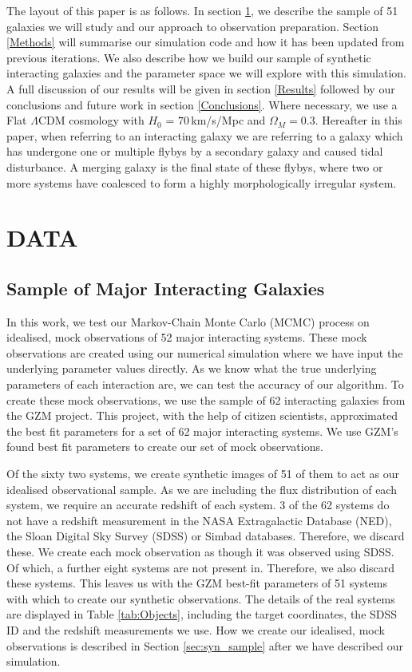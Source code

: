 The layout of this paper is as follows. In section \ref{Data}, we describe the sample of 51 galaxies we will study and our approach to observation preparation. Section \ref{Methods} will summarise our simulation code and how it has been updated from previous iterations. We also describe how we build our sample of synthetic interacting galaxies and the parameter space we will explore with this simulation. A full discussion of our results will be given in section \ref{Results} followed by our conclusions and future work in section \ref{Conclusions}. Where necessary, we use a Flat $\Lambda$CDM cosmology with $H_0$ = $70$\,km/s/Mpc and $\Omega_M = 0.3$. Hereafter in this paper, when referring to an interacting galaxy we are referring to a galaxy which has undergone one or multiple flybys by a secondary galaxy and caused tidal disturbance. A merging galaxy is the final state of these flybys, where two or more systems have coalesced to form a highly morphologically irregular system.

\vspace{-5mm}
\section{DATA}\label{Data}
\subsection{Sample of Major Interacting Galaxies}
\noindent In this work, we test our Markov-Chain Monte Carlo (MCMC) process on idealised, mock observations of 52 major interacting systems. These mock observations are created using our numerical simulation where we have input the underlying parameter values directly. As we know what the true underlying parameters of each interaction are, we can test the accuracy of our algorithm. To create these mock observations, we use the sample of 62 interacting galaxies from the GZM project. This project, with the help of citizen scientists, approximated the best fit parameters for a set of 62 major interacting systems. We use GZM's found best fit parameters to create our set of mock observations.

Of the sixty two systems, we create synthetic images of 51 of them to act as our idealised observational sample. As we are including the flux distribution of each system, we require an accurate redshift of each system. 3 of the 62 systems do not have a redshift measurement in the NASA Extragalactic Database (NED), the Sloan Digital Sky Survey (SDSS) or Simbad databases. Therefore, we discard these. We create each mock observation as though it was observed using SDSS. Of which, a further eight systems are not present in. Therefore, we also discard these systems. This leaves us with the GZM best-fit parameters of 51 systems with which to create our synthetic observations. The details of the real systems are displayed in Table \ref{tab:Objects}, including the target coordinates, the SDSS ID and the redshift measurements we use. How we create our idealised, mock observations is described in Section \ref{sec:syn_sample} after we have described our simulation.

